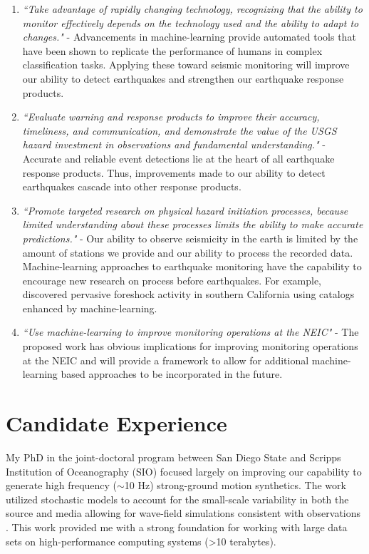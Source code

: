 \documentclass[12p]{article}
\begin{document}
\begin{enumerate}
  \item \emph{``Take advantage of rapidly changing technology, recognizing that the ability to monitor effectively
  depends on the technology used and the ability to adapt to changes."} - Advancements in machine-learning provide
  automated tools that have been shown to replicate the performance of humans in complex classification tasks. Applying
  these toward seismic monitoring will improve our ability to detect earthquakes and strengthen our earthquake response
  products.

  \item \emph{``Evaluate warning and response products to improve their accuracy, timeliness, and communication, and
  demonstrate the value of the USGS hazard investment in observations and fundamental understanding."} - Accurate and
  reliable event detections lie at the heart of all earthquake response products. Thus, improvements made to our ability
  to detect earthquakes cascade into other response products.

  \item \emph{``Promote targeted research on physical hazard initiation processes, because limited understanding about
  these processes limits the ability to make accurate predictions."} - Our ability to observe seismicity in the earth is
  limited by the amount of stations we provide and our ability to process the recorded data. Machine-learning approaches
  to earthquake monitoring have the capability to encourage new research on process before earthquakes. For example,
  \citet{Trugman2019} discovered pervasive foreshock activity in southern California using catalogs enhanced by
  machine-learning.

  \item \emph{``Use machine-learning to improve monitoring operations at the NEIC"} - The proposed work has obvious
  implications for improving monitoring operations at the NEIC and will provide a framework to allow for additional
  machine-learning based approaches to be incorporated in the future.
\end{enumerate}

\section{Candidate Experience}

My PhD in the joint-doctoral program between San Diego State and Scripps Institution of Oceanography (SIO) focused
largely on improving our capability to generate high frequency ($\sim$10 Hz) strong-ground motion synthetics. The work
utilized stochastic models to account for the small-scale variability in both the source and media allowing for
wave-field simulations consistent with observations \citep{Savran2016, Savran2019}. This work provided me with a strong
foundation for working with large data sets on high-performance computing systems (>10 terabytes).
\end{document}
